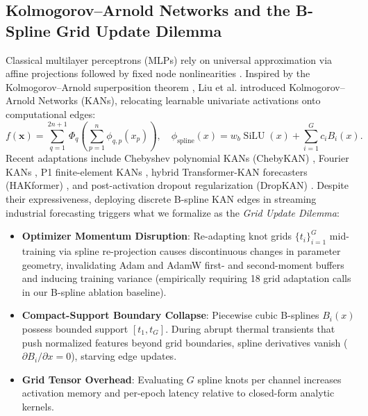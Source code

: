\documentclass[pdflatex,sn-mathphys-num,referee,lineno]{sn-jnl}
\theoremstyle{thmstyleone}
\theoremstyle{thmstyletwo}
\theoremstyle{thmstylethree}
\begin{document}
\subsection{Kolmogorov--Arnold Networks and the B-Spline Grid Update Dilemma}\label{subsec:kan_dilemma}
Classical multilayer perceptrons (MLPs) rely on universal approximation via affine projections followed by fixed node nonlinearities \cite{cybenko1989approximation, hornik1989multilayer}. Inspired by the Kolmogorov--Arnold superposition theorem \cite{kolmogorov1957representation, arnold1957representation}, Liu et al. \cite{liu2024kan} introduced Kolmogorov--Arnold Networks (KANs), relocating learnable univariate activations onto computational edges:
\begin{equation}
f(\mathbf{x}) = \sum_{q=1}^{2n+1} \Phi_q \left( \sum_{p=1}^n \phi_{q,p}(x_p) \right), \quad \phi_{\mathrm{spline}}(x) = w_b \operatorname{SiLU}(x) + \sum_{i=1}^G c_i B_i(x).
\label{eq:kan_bspline}
\end{equation}
Recent adaptations include Chebyshev polynomial KANs (ChebyKAN) \cite{sidharth2024chebykan}, Fourier KANs \cite{xu2024fourierkan}, P1 finite-element KANs \cite{warin2026p1kan}, hybrid Transformer-KAN forecasters (HAKformer) \cite{lv2026hakformer}, and post-activation dropout regularization (DropKAN) \cite{altarabichi2024dropkan}. Despite their expressiveness, deploying discrete B-spline KAN edges in streaming industrial forecasting triggers what we formalize as the \emph{Grid Update Dilemma}:
\begin{itemize}
    \item \textbf{Optimizer Momentum Disruption}: Re-adapting knot grids $\{t_i\}_{i=1}^G$ mid-training via spline re-projection causes discontinuous changes in parameter geometry, invalidating Adam \cite{kingma2015adam} and AdamW \cite{loshchilov2019adamw} first- and second-moment buffers and inducing training variance (empirically requiring 18 grid adaptation calls in our B-spline ablation baseline).
    \item \textbf{Compact-Support Boundary Collapse}: Piecewise cubic B-splines $B_i(x)$ possess bounded support $[t_1, t_G]$. During abrupt thermal transients that push normalized features beyond grid boundaries, spline derivatives vanish ($\partial B_i / \partial x = 0$), starving edge updates.
    \item \textbf{Grid Tensor Overhead}: Evaluating $G$ spline knots per channel increases activation memory and per-epoch latency relative to closed-form analytic kernels.
\end{itemize}
\end{document}
